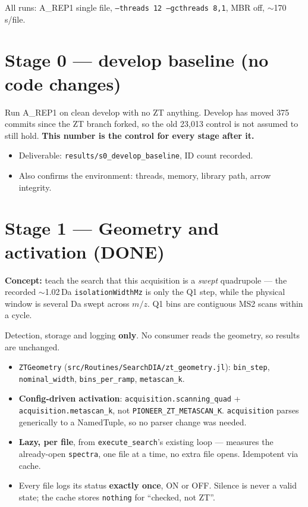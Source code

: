 \documentclass[11pt]{article}
\newcommand{\code}[1]{\texttt{\small #1}}
\begin{document}
All runs: A\_REP1 single file, \code{--threads 12 --gcthreads 8,1}, MBR off, $\sim$170\,s/file.

\section{Stage 0 --- develop baseline (no code changes)}

Run A\_REP1 on clean develop with no ZT anything. Develop has moved 375 commits since the ZT
branch forked, so the old 23,013 control is not assumed to still hold. \textbf{This number is the
control for every stage after it.}

\begin{itemize}[leftmargin=*,itemsep=0.2em]
  \item Deliverable: \code{results/s0\_develop\_baseline}, ID count recorded.
  \item Also confirms the environment: threads, memory, library path, arrow integrity.
\end{itemize}

\section{Stage 1 --- Geometry and activation \textnormal{(DONE)}}

\textbf{Concept:} teach the search that this acquisition is a \emph{swept} quadrupole --- the
recorded $\sim$1.02\,Da \code{isolationWidthMz} is only the Q1 step, while the physical window is
several Da swept across $m/z$. Q1 bins are contiguous MS2 scans within a cycle.

Detection, storage and logging \textbf{only}. No consumer reads the geometry, so results are
unchanged.

\begin{itemize}[leftmargin=*,itemsep=0.2em]
  \item \code{ZTGeometry} (\code{src/Routines/SearchDIA/zt\_geometry.jl}): \code{bin\_step},
        \code{nominal\_width}, \code{bins\_per\_ramp}, \code{metascan\_k}.
  \item \textbf{Config-driven activation}: \code{acquisition.scanning\_quad} +
        \code{acquisition.metascan\_k}, not \code{PIONEER\_ZT\_METASCAN\_K}. \code{acquisition}
        parses generically to a NamedTuple, so no parser change was needed.
  \item \textbf{Lazy, per file}, from \code{execute\_search}'s existing loop --- measures the
        already-open \code{spectra}, one file at a time, no extra file opens. Idempotent via cache.
  \item Every file logs its status \textbf{exactly once}, ON or OFF. Silence is never a valid
        state; the cache stores \code{nothing} for ``checked, not ZT''.
\end{itemize}
\end{document}
